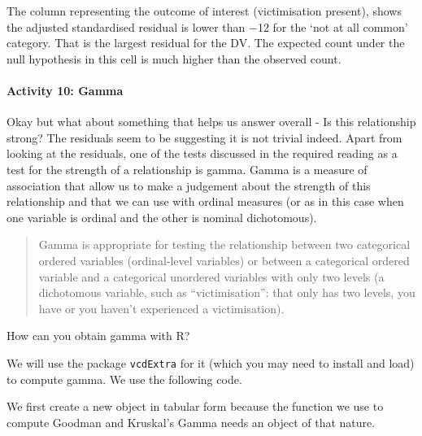 \documentclass[
]{book}
\newenvironment{Shaded}{\begin{snugshade}}{\end{snugshade}}
\newcommand{\FloatTok}[1]{\textcolor[rgb]{0.00,0.00,0.81}{#1}}
\newcommand{\FunctionTok}[1]{\textcolor[rgb]{0.00,0.00,0.00}{#1}}
\newcommand{\NormalTok}[1]{#1}
\newcommand{\OtherTok}[1]{\textcolor[rgb]{0.56,0.35,0.01}{#1}}
\newcommand{\SpecialCharTok}[1]{\textcolor[rgb]{0.00,0.00,0.00}{#1}}
\begin{document}
The column representing the outcome of interest (victimisation present), shows the adjusted standardised residual is lower than −12 for the `not at all common' category. That is the largest residual for the DV. The expected count under the null hypothesis in this cell is much higher than the observed count.

\hypertarget{activity-10-gamma}{%
\paragraph{Activity 10: Gamma}\label{activity-10-gamma}}

Okay but what about something that helps us answer overall - Is this relationship strong? The residuals seem to be suggesting it is not trivial indeed. Apart from looking at the residuals, one of the tests discussed in the required reading as a test for the strength of a relationship is gamma. Gamma is a measure of association that allow us to make a judgement about the strength of this relationship and that we can use with ordinal measures (or as in this case when one variable is ordinal and the other is nominal dichotomous).

\begin{quote}
Gamma is appropriate for testing the relationship between two categorical ordered variables (ordinal-level variables) or between a categorical ordered variable and a categorical unordered variables with only two levels (a dichotomous variable, such as ``victimisation'': that only has two levels, you have or you haven't experienced a victimisation).
\end{quote}

How can you obtain gamma with R?

We will use the package \texttt{vcdExtra} for it (which you may need to install and load) to compute gamma. We use the following code.

We first create a new object in tabular form because the function we use to compute Goodman and Kruskal's Gamma needs an object of that nature.

\begin{Shaded}
\end{Shaded}
\end{document}
